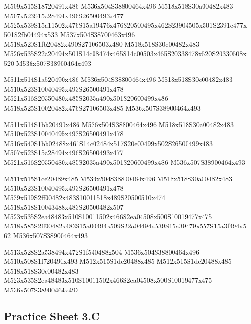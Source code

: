 \documentclass{article}
\begin{document}
\begin{multicols}{5}
\begin{center}
M509x515S18720491x486 %
M536x504S38800464x496 %
M518x518S30a00482x483 %
M507x523S15a28494x496S26500493x477 %
M525x539S15a11502x476S15a19476x476S20500495x462S23904505x501S2391c477x501S2fb04494x533 %
M537x504S38700463x496 %
M518x520S1fb20482x490S27106503x480 %
M518x518S30c00482x483 %
M526x535S22a20494x501S14c08474x465S14c00503x465S20338478x520S20330508x520 %
M536x507S38900464x493 %
\vfil
\columnbreak

M511x514S1a520490x486 %
M536x504S38800464x496 %
M518x518S30c00482x483 %
M510x523S10040495x493S26500491x478 %
M521x516S20350480x485S2035a490x501S20600499x486 %
M518x525S10020482x476S27106503x485 %
M536x507S38900464x493 %
\vfil
\columnbreak

M511x514S1bb20490x486 %
M536x504S38800464x496 %
M518x518S30a00482x483 %
M510x523S10040495x493S26500491x478 %
M516x540S1bb02488x461S14c02484x517S20e00499x502S26500499x483 %
M507x523S15a28494x496S26500493x477 %
M521x516S20350480x485S2035a490x501S20600499x486 %
M536x507S38900464x493 %
\vfil
\columnbreak

M511x515S1ce20489x485 %
M536x504S38800464x496 %
M518x518S30a00482x483 %
M510x523S10040495x493S26500491x478 %
M539x519S2ff00482x483S10011518x489S20500510x474 %
M518x518S10043488x483S20500482x507 %
M523x535S2ea48483x510S10011502x466S2ea04508x500S10019477x475 %
M518x585S2ff00482x483S15a00494x509S22a04494x539S15a39479x557S15a3f494x562 %
M536x507S38900464x493 %
\vfil
\columnbreak

M513x528S2a538494x472S1f540488x504 %
M536x504S38800464x496 %
M510x508S1f720490x493 %
M512x515S1dc20488x485 %
M512x515S1dc20488x485 %
M518x518S30c00482x483 %
M523x535S2ea48483x510S10011502x466S2ea04508x500S10019477x475 %
M536x507S38900464x493 %
\vfil

\end{center}
\end{multicols}

\subsection{Practice Sheet 3.C}
\end{document}
